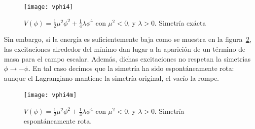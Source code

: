 \begin{frame}
\begin{figure} %
  \centering %
  \texttt{[image: vphi4]}
  \caption{$V(\phi)=\frac{1}{2}\mu^2 \phi^2+\frac{1}{4}\lambda\phi^4$ con $\mu^2\lt 0$, y $\lambda\gt 0$. Simetría exácta} %
  \label{fig:x2l} %
\end{figure} %
Sin embargo, si la energía es suficientemente baja como se muestra en la figura~\ref{fig:x2lm}, las excitaciones alrededor del mínimo dan lugar a la aparición de un término de masa para el campo escalar. Además, dichas excitaciones no respetan la simetrías $\phi\to-\phi$. En tal caso decimos que la simetría ha sido espontáneamente rota: aunque el Lagrangiano mantiene la simetría original, el vacío la rompe. 

\begin{figure} %
  \centering %
  \texttt{[image: vphi4m]}
  \caption{$V(\phi)=\frac{1}{2}\mu^2 \phi^2+\frac{1}{4}\lambda\phi^4$ con $\mu^2\lt 0$, y $\lambda\gt 0$. Simetría espontáneamente rota.} %
  \label{fig:x2lm} %
\end{figure}  %


\end{frame}
